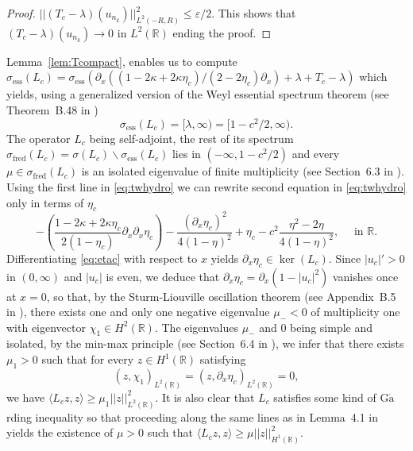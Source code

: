\documentclass[11pt]{article}
\newcommand{\R}{\mathbb{R}}
\theoremstyle{plain}
\theoremstyle{definition}
\theoremstyle{remark}
\numberwithin{equation}{section}
\begin{document}
{\begin{proof}
		$||(T_c-\lambda)(u_{n_k})||^2_{L^2(-R,R)}\leq\varepsilon/2$. This shows that $(T_c-\lambda)(u_{n_k})\to0$ in $ L^2(\R)$ ending the proof.
	\end{proof}
	Lemma~\ref{lem:Tcompact}, enables us to compute $\sigma_{\mathrm{ess}}(L_c)=\sigma_{\mathrm{ess}}(\partial_x((1-2\kappa+2\kappa\eta_c)/(2-2\eta_c)\partial_x)+\lambda+T_c-\lambda)$ which yields, using a generalized version of the Weyl essential spectrum theorem (see Theorem~B.48 in \cite{angulospectral})
	\begin{equation}\label{eq:spectrL}
		\sigma_{\mathrm{ess}}(L_c)=[\lambda,\infty)=[1-c^2/2,\infty).
	\end{equation}
	The operator $L_c$ being self-adjoint, the rest of its spectrum $\sigma_{\mathrm{fred}}(L_c)=\sigma(L_c)\backslash\sigma_{\mathrm{ess}}(L_c)$ lies in $(-\infty,1-c^2/2)$ and every $\mu\in\sigma_{\mathrm{fred}}(L_c)$ is an isolated eigenvalue of finite multiplicity (see Section~6.3 in \cite{spectraltheorybook}). 
	Using the first line in \eqref{eq:twhydro} we can rewrite second equation in \eqref{eq:twhydro} only in terms of $\eta_c$
	\begin{equation}\label{eq:etac}
		-\left(\frac{1-2\kappa+2\kappa\eta_c}{2(1-\eta_c)}\partial_{x}\partial_x\eta_c\right)-\frac{(\partial_x\eta_c)^2}{4(1-\eta)^2}+\eta_c-c^2\frac{\eta^2-2\eta}{4(1-\eta)^2},\quad\text{ in }\R.
	\end{equation}
	Differentiating \eqref{eq:etac} with respect to $x$ yields
	$\partial_x\eta_c\in \ker(L_c)$. Since $|u_c|'>0$ in $(0,\infty)$ and $|u_c|$ is even, we deduce that $\partial_x\eta_c=\partial_x(1-|u_c|^2)$ vanishes once at $x=0$, so that, by the Sturm-Liouville oscillation theorem (see Appendix~B.5 in \cite{angulospectral}), there exists one and only one negative eigenvalue $\mu_-<0$ of multiplicity one with eigenvector $\chi_1\in H^2(\R)$.
	The eigenvalues $\mu_-$ and $0$ being simple and isolated, by the min-max principle (see Section~6.4 in \cite{spectraltheorybook}), we infer that there exists $\mu_1>0$ such that for every $z\in H^1(\R)$ satisfying
	\begin{equation}\label{eq:ortheta}
		(z,\chi_1)_{ L^2(\R)}=(z,\partial_x\eta_c)_{ L^2(\R)}=0,
	\end{equation} we have
	$\langle L_cz,z\rangle\geq\mu_1||z||_{ L^2(\R)}^2. $
	It is also clear that $L_c$ satisfies some kind of G$\mathring{\mathrm{a}}$rding inequality so that proceeding along the same lines as in Lemma~4.1 in \cite{linbubbles} yields the existence of $\mu>0$ such that $\langle L_cz,z\rangle\geq\mu||z||_{ H^1(\R)}^2.$
}
\end{document}
